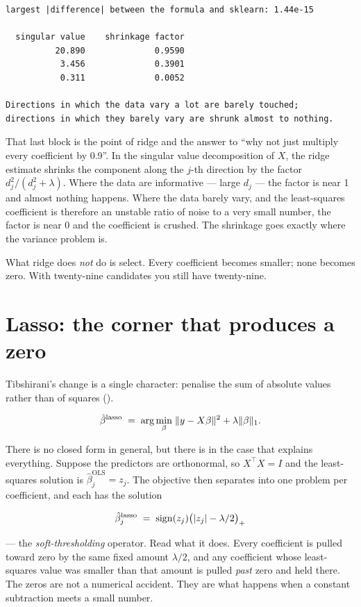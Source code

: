 \documentclass[
  letterpaper,
  10pt,
  twoside,
  openright,
  numbers=noenddot,
  chapterprefix=true]{scrbook}
\begin{document}
\begin{verbatim}
largest |difference| between the formula and sklearn: 1.44e-15

  singular value    shrinkage factor
          20.890              0.9590
           3.456              0.3901
           0.311              0.0052

Directions in which the data vary a lot are barely touched;
directions in which they barely vary are shrunk almost to nothing.
\end{verbatim}

That last block is the point of ridge and the answer to ``why not just
multiply every coefficient by 0.9''. In the singular value decomposition
of \(X\), the ridge estimate shrinks the component along the \(j\)-th
direction by the factor \(d_j^2 / (d_j^2 + \lambda)\). Where the data
are informative --- large \(d_j\) --- the factor is near 1 and almost
nothing happens. Where the data barely vary, and the least-squares
coefficient is therefore an unstable ratio of noise to a very small
number, the factor is near 0 and the coefficient is crushed. The
shrinkage goes exactly where the variance problem is.

What ridge does \emph{not} do is select. Every coefficient becomes
smaller; none becomes zero. With twenty-nine candidates you still have
twenty-nine.

\section{Lasso: the corner that produces a
zero}\label{lasso-the-corner-that-produces-a-zero}

Tibshirani's change is a single character: penalise the sum of absolute
values rather than of squares ().

\[
\hat\beta^{\text{lasso}}
\thickspace=\thickspace
\arg\min_\beta \thickspace \lVert y - X\beta \rVert^2 + \lambda \lVert \beta \rVert_1 .
\]

There is no closed form in general, but there is in the case that
explains everything. Suppose the predictors are orthonormal, so
\(X^\top X = I\) and the least-squares solution is
\(\hat\beta^{\text{OLS}}_j = z_j\). The objective then separates into
one problem per coefficient, and each has the solution

\[
\hat\beta_j^{\text{lasso}}
\thickspace=\thickspace
\mathrm{sign}(z_j)\big(|z_j| - \lambda/2\big)_+
\]

--- the \emph{soft-thresholding} operator. Read what it does. Every
coefficient is pulled toward zero by the same fixed amount
\(\lambda/2\), and any coefficient whose least-squares value was smaller
than that amount is pulled \emph{past} zero and held there. The zeros
are not a numerical accident. They are what happens when a constant
subtraction meets a small number.
\end{document}
